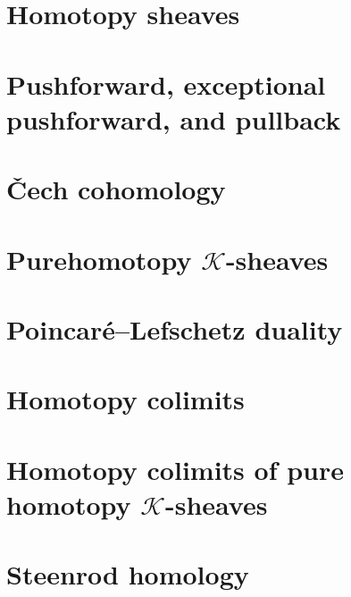 \chapter{Homotopy sheaves}

\chapter{Pushforward, exceptional pushforward, and pullback}

\chapter{\v{C}ech cohomology}

\chapter{Purehomotopy $\mathcal{K}$-sheaves}

\chapter{Poincaré–Lefschetz duality}

\chapter{Homotopy colimits}

\chapter{Homotopy colimits of pure homotopy $\mathcal{K}$-sheaves}

\chapter{Steenrod homology}